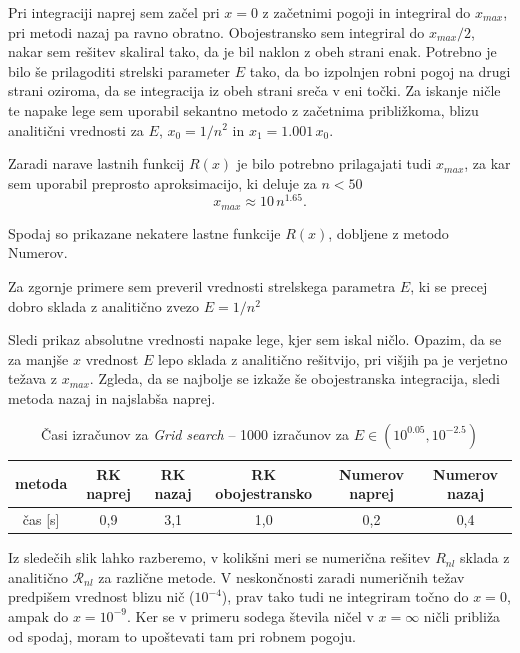 Pri integraciji naprej sem začel pri $x=0$ z začetnimi pogoji in integriral do $x_{max}$, pri metodi nazaj pa ravno obratno. Obojestransko sem integriral do $x_{max}/2$, nakar sem rešitev skaliral tako, da je bil naklon z obeh strani enak. Potrebno je bilo še prilagoditi strelski parameter $E$ tako, da bo izpolnjen robni pogoj na drugi strani oziroma, da se integracija iz obeh strani sreča v eni točki. Za iskanje ničle te napake lege sem uporabil sekantno metodo z začetnima približkoma, blizu analitični vrednosti za $E$, $x_0= 1/n^2$ in $x_1=1.001\,x_0$.

Zaradi narave lastnih funkcij $R(x)$ je bilo potrebno prilagajati tudi $x_{max}$, za kar sem uporabil preprosto aproksimacijo, ki deluje za $n<50$
\begin{equation}
    x_{max} \approx 10\,n^{1.65}.
\end{equation}

Spodaj so prikazane nekatere lastne funkcije $R(x)$, dobljene z metodo Numerov.


Za zgornje primere sem preveril vrednosti strelskega parametra $E$, ki se precej dobro sklada z analitično zvezo $E=1/n^2$


Sledi prikaz absolutne vrednosti napake lege, kjer sem iskal ničlo. Opazim, da se za manjše $x$ vrednost $E$ lepo sklada z analitično rešitvijo, pri višjih pa je verjetno težava z $x_{max}$. Zgleda, da se najbolje se izkaže še obojestranska integracija, sledi metoda nazaj in najslabša naprej.


\begin{table}[H]
    \begin{tabular}{c|c c c c c}
        metoda & RK naprej & RK nazaj & RK obojestransko & Numerov naprej & Numerov nazaj \\\hline
        čas [s] & 0,9 & 3,1 & 1,0 & 0,2 & 0,4
    \end{tabular}
    \caption{Časi izračunov za \textit{Grid search} -- 1000 izračunov za $E \in (10^{0.05}, 10^{-2.5})$}
\end{table}

Iz sledečih slik lahko razberemo, v kolikšni meri se numerična rešitev $R_{nl}$ sklada z analitično $\mathcal{R}_{nl}$ za različne metode. V neskončnosti zaradi numeričnih težav predpišem vrednost blizu nič ($10^{-4}$), prav tako tudi ne integriram točno do $x=0$, ampak do $x=10^{-9}$. Ker se v primeru sodega števila ničel v $x=\infty$ ničli približa od spodaj, moram to upoštevati tam pri robnem pogoju.

